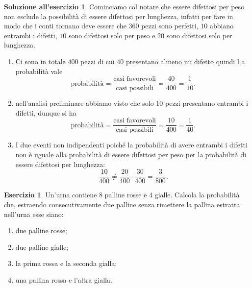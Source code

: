 \documentclass[12pt,a4paper]{article}
\theoremstyle{definition}
\newtheorem{sol}{Soluzione all'esercizio}
\newtheorem{exe}{Esercizio}
\begin{document}
\begin{sol} Cominciamo col notare che essere difettosi per peso non esclude la possibilità di essere difettosi per lunghezza, infatti per fare in modo che i conti tornano deve essere che $ 360 $ pezzi sono perfetti, $ 10 $ abbiano entrambi i difetti, $ 10 $ sono difettosi solo per peso e $ 20 $ sono difettosi solo per lunghezza.
	\begin{enumerate}
		\item Ci sono in totale $ 400 $ pezzi di cui $ 40 $ presentano almeno un difetto quindi l a probabilità vale
		      \[ \text{probabilità} = \frac{\text{casi favorevoli}}{\text{casi possibili}} = \frac{40}{400} = \frac{1}{10}. \]
		\item nell'analisi preliminare abbiamo visto che solo $ 10 $ pezzi presentano entrambi i difetti, dunque si ha
		      \[ \text{probabilità} = \frac{\text{casi favorevoli}}{\text{casi possibili}} = \frac{10}{400} = \frac{1}{40}. \]
		\item I due eventi non indipendenti poiché la probabilità di avere entrambi i difetti non è uguale alla probabilità di essere difettosi per peso per la probabilità di essere difettosi per lunghezza:
		      \[ \frac{10}{400} \ne \frac{20}{400}\cdot \frac{30}{400} = \frac{3}{800}. \]
	\end{enumerate}
\end{sol}

\begin{exe}
	Un'urna contiene $ 8 $  palline rosse e $ 4 $ gialle. Calcola la probabilità che, estraendo consecutivamente due palline senza rimettere la pallina estratta nell'urna esse siano:
	\begin{enumerate}
		\item due palline rosse;
		\item due palline gialle;
		\item la prima rossa e la seconda gialla;
		\item una pallina rossa e l'altra gialla.
	\end{enumerate}
\end{exe}
\end{document}
